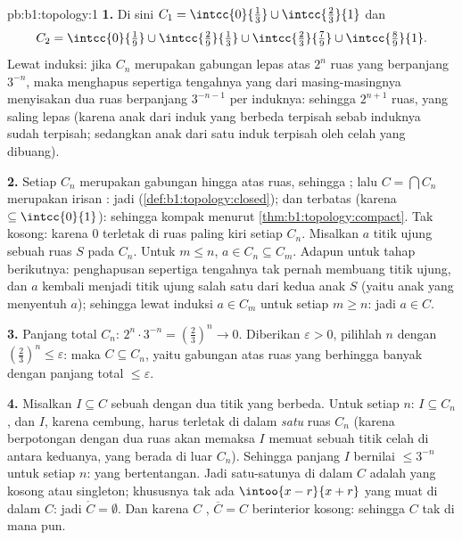 \begin{solution}{pb:b1:topology:1}
\textbf{1.} Di sini $C_1 = \intcc{0}{\frac13} \cup \intcc{\frac23}{1}$
dan
\[
C_2 = \intcc{0}{\tfrac19} \cup \intcc{\tfrac29}{\tfrac13}
\cup \intcc{\tfrac23}{\tfrac79} \cup \intcc{\tfrac89}{1} .
\]
Lewat induksi: jika $C_n$ merupakan gabungan lepas atas $2^n$ ruas 
yang berpanjang $3^{-n}$, maka menghapus sepertiga tengahnya yang  dari masing-masingnya
menyisakan dua ruas  berpanjang $3^{-n-1}$ per induknya:
sehingga $2^{n+1}$ ruas, yang saling lepas (karena anak dari induk yang berbeda
terpisah sebab induknya sudah terpisah; sedangkan anak dari satu
induk terpisah oleh celah yang dibuang).

\textbf{2.} Setiap $C_n$ merupakan gabungan hingga atas ruas, sehingga
; lalu $C = \bigcap C_n$ merupakan irisan :
jadi  (\cref{def:b1:topology:closed}); dan terbatas (karena $\subseteq
\intcc{0}{1}$): sehingga kompak menurut \cref{thm:b1:topology:compact}.
Tak kosong: karena $0$ terletak di ruas paling kiri setiap $C_n$. Misalkan
$a$ titik ujung sebuah ruas $S$ pada $C_n$. Untuk $m \leq n$,
$a \in C_n \subseteq C_m$. Adapun untuk tahap berikutnya: penghapusan sepertiga
tengahnya tak pernah membuang titik ujung, dan $a$ kembali menjadi titik ujung
salah satu dari kedua anak $S$ (yaitu anak yang menyentuh $a$); sehingga lewat
induksi $a \in C_m$ untuk setiap $m \geq n$: jadi $a \in C$.

\textbf{3.} Panjang total $C_n$: $2^n \cdot 3^{-n} =
(\frac23)^n \to 0$. Diberikan $\varepsilon > 0$, pilihlah $n$ dengan
$(\frac23)^n \leq \varepsilon$: maka $C \subseteq C_n$, yaitu gabungan
atas ruas yang berhingga banyak dengan panjang total $\leq \varepsilon$.

\textbf{4.} Misalkan $I \subseteq C$ sebuah  dengan dua titik
yang berbeda. Untuk setiap $n$: $I \subseteq C_n$, dan $I$, karena cembung,
harus terletak di dalam \emph{satu} ruas $C_n$ (karena berpotongan dengan dua
ruas akan memaksa $I$ memuat sebuah titik celah di antara
keduanya, yang berada di luar $C_n$). Sehingga panjang $I$ bernilai $\leq
3^{-n}$ untuk setiap $n$: yang bertentangan. Jadi satu-satunya 
di dalam $C$ adalah yang kosong atau singleton; khususnya tak ada
$\intoo{x-r}{x+r}$ yang muat di dalam $C$: jadi $\mathring C = \emptyset$.
Dan karena $C$ , $\overline C = C$ berinterior kosong: sehingga $C$
tak  di mana pun.


\end{solution}
